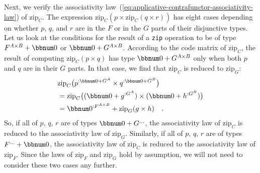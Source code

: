 Next, we verify the associativity law~(\ref{eq:applicative-contrafunctor-associativity-law})
of $\text{zip}_{C}$. The expression $\text{zip}_{C}(p\times\text{zip}_{C}(q\times r))$
has eight cases depending on whether $p$, $q$, and $r$ are in the
$F$ or in the $G$ parts of their disjunctive types. Let us look
at the conditions for the result of a \lstinline!zip! operation to
be of type $F^{A\times B}+\bbnum 0$ or $\bbnum 0+G^{A\times B}$.
According to the code matrix of $\text{zip}_{C}$, the result of computing
$\text{zip}_{C}(p\times q)$ has type $\bbnum 0+G^{A\times B}$ only
when both $p$ and $q$ are in their $G$ parts. In that case, we
find that $\text{zip}_{C}$ is reduced to $\text{zip}_{G}$:
\begin{align*}
 & \text{zip}_{C}\big(p^{:\bbnum 0+G^{A}}\times q^{:\bbnum 0+G^{B}}\big)\\
 & =\text{zip}_{C}\big((\bbnum 0+g^{:G^{A}})\times(\bbnum 0+h^{:G^{B}})\big)\\
 & =\bbnum 0^{:F^{A\times B}}+\text{zip}_{G}(g\times h)\quad.
\end{align*}
So, if all of $p$, $q$, $r$ are of types $\bbnum 0+G^{...}$, the
associativity law of $\text{zip}_{C}$ is reduced to the associativity
law of $\text{zip}_{G}$. Similarly, if all of $p$, $q$, $r$ are
of types $F^{...}+\bbnum 0$, the associativity law of $\text{zip}_{C}$
is reduced to the associativity law of $\text{zip}_{F}$. Since the
laws of $\text{zip}_{F}$ and $\text{zip}_{G}$ hold by assumption,
we will not need to consider these two cases any further. 

